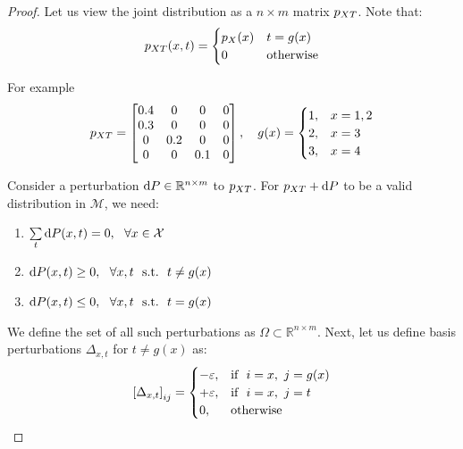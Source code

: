 \begin{proof}
Let us view the joint distribution as a $n\times m$ matrix $p_{XT}$. Note that:
\begin{align}
    \label{ch3:eq:g2Pxt}
    p_{XT} (x, t) = 
    \begin{cases}
        p_X(x) & t = g(x) \\
        0 & \text{otherwise}
    \end{cases}
\end{align}

For example
\begin{align}
    \label{ch3:eq:example}
    p_{XT} = 
    \begin{bmatrix}
        0.4 & 0 & 0 & 0 \\
        0.3 & 0 & 0 & 0 \\
        0 & 0.2 & 0 & 0 \\
        0 & 0 & 0.1 & 0 \\
    \end{bmatrix}
    , \quad g(x) = 
    \begin{cases}
        1, & x = 1, 2 \\
        2, & x = 3 \\
        3, & x = 4 \\
    \end{cases}
\end{align}

Consider a perturbation $\text{d}{P} \in \mathbb{R}^{n \times m}$ to $ p_{XT} $. For $p_{XT} + \text{d}{P}$ to be a valid distribution in $\mathcal{M}$, we need:
\begin{enumerate}
    \item $ \textstyle\sum\limits_{t} \text{d}{P}(x, t) = 0, \ \ \forall x \in \mathcal{X} $ \vspace{-5pt}
    \item $ \dP(x,t) \geq 0, \ \ \forall x, t \ \ \text{s.t.}  \ \ t \neq g(x) $
    \item $ \dP(x,t) \leq 0,  \ \ \forall x, t \ \ \text{s.t.}  \ \ t = g(x) $
\end{enumerate}

We define the set of all such perturbations as $\Omega\subset \mathbb{R}^{n \times m} $. Next, let us define basis perturbations $ \Delta_{x,t} $ for $t \neq g(x)$ as:
\begin{align}
    \left[ \Delta_{x,t} \right]_{ij} = \label{ch3:eq:delta}
    \begin{cases}
      -\varepsilon, & \text{if} \ \ i=x, \ j=g(x) \\
      +\varepsilon, & \text{if} \ \ i=x, \ j=t \\
      0, & \text{otherwise}
    \end{cases}
\end{align}


\end{proof}
